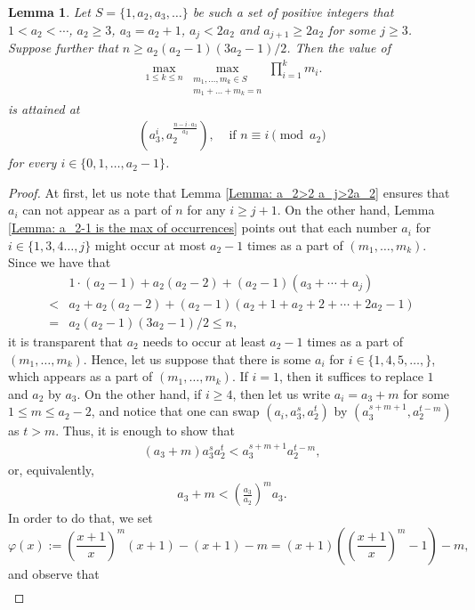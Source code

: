 \documentclass[12pt]{amsart}
\newtheorem{lemma}[theorem]{Lemma}
\theoremstyle{definition}
\theoremstyle{remark}
\numberwithin{theorem}{section} \numberwithin{equation}{section}
\begin{document}
\begin{lemma}\label{Lemma: a_3=a_2+1}
Let $S=\{1,a_2,a_3,\ldots\}$ be such a set of positive integers that $1<a_2<\cdots$, $a_2\geq3$, $a_3=a_2+1$, $a_{j}<2a_2$ and $a_{j+1}\geq2a_2$ for some $j\geq3$. Suppose further that $n\geq a_2(a_2-1)(3a_2-1)/2$. Then the value of 
\begin{align*}
\max_{1\leq k\leq n}\max_{\substack{ m_1,\ldots,m_k\in S \\ m_{1}+\ldots +m_{k}=n}}\prod_{i=1}^km_i.
\end{align*}
is attained at
\begin{align*}
(a_3^{i},a_2^{\frac{n-i\cdot a_3}{a_2}}), &\text{ if } n\equiv i\pmod{a_2}
\end{align*}
for every $i\in\{0,1,\ldots,a_2-1\}$.
\end{lemma}
\begin{proof}
At first, let us note that Lemma \ref{Lemma: a_2>2 a_j>2a_2} ensures that $a_i$ can not appear as a part of $n$ for any $i\geq j+1$. On the other hand, Lemma \ref{Lemma: a_2-1 is the max of occurrences} points out that each number $a_i$ for $i\in\{1,3,4\ldots,j\}$ might occur at most $a_2-1$ times as a part of $(m_1,\ldots,m_k)$. Since we have that
\begin{align*}
&1\cdot (a_2-1)+ a_2(a_2-2)+ (a_2-1)(a_3+\cdots+a_j)\\
<&a_2+a_2(a_2-2)+(a_2-1)(a_2+1+a_2+2+\cdots+2a_2-1)\\
= &a_2(a_2-1)(3a_2-1)/2\leq n,
\end{align*}
it is transparent that $a_2$ needs to occur at least $a_2-1$ times as a part of $(m_1,\ldots,m_k)$. Hence, let us suppose that there is some $a_i$ for $i\in\{1,4,5,\ldots,\}$, which appears as a part of $(m_1,\ldots,m_k)$. If $i=1$, then it suffices to replace $1$ and $a_2$ by $a_3$. On the other hand, if $i\geq 4$, then let us write $a_i=a_3+m$ for some $1\leq m \leq a_2-2$, and notice that one can swap $(a_i,a_3^s,a_2^t)$ by $(a_3^{s+m+1},a_2^{t-m})$ as $t>m$. Thus, it is enough to show that
\begin{align*}
(a_3+m)a_3^sa_2^t<a_3^{s+m+1}a_2^{t-m},
\end{align*} 
or, equivalently,
\begin{align*}
a_3+m<\left(\frac{a_3}{a_2}\right)^ma_3.
\end{align*}
In order to do that, we set 
$$\varphi (x):=\left(\frac{x+1}{x}\right)^m(x+1)-(x+1)-m=(x+1)\left(\left(\frac{x+1}{x}\right)^m-1\right)-m,$$
and observe that 
\begin{align*}

\end{align*}
\end{proof}
\end{document}
